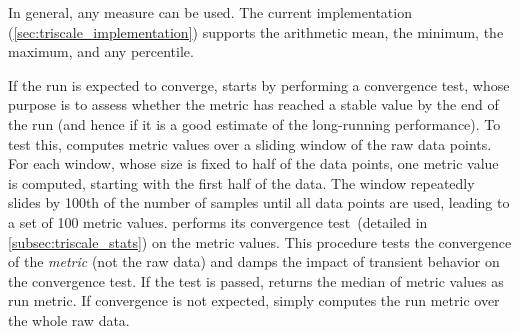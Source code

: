 %

\noindent
In general, any measure can be used. The current implementation (\cref{sec:triscale_implementation}) supports the arithmetic mean, the minimum, the maximum, and any percentile.

If the run is expected to converge, \triscale starts by performing a convergence test, whose purpose is to assess whether the metric has reached a stable value by the end of the run (and hence if it is a good estimate of the long-running performance).
%
To test this, \triscale computes metric values over a sliding window of the raw data points. For each window, whose size is fixed to half of the data points, one metric value is computed, starting with the first half of the data.
The window repeatedly slides by 100th of the number of samples until all data points are used, leading to a set of 100 metric values.%
\triscale performs its convergence test~(detailed in \cref{subsec:triscale_stats}) on the metric values.
This procedure tests the convergence of the \emph{metric} (not the raw data) and damps the impact of transient behavior on the convergence test.
If the test is passed, \triscale returns the median of metric values as run metric.
If convergence is not expected, \triscale simply computes the run metric over the whole raw data.


